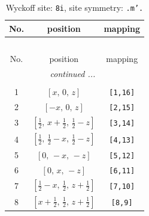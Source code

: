 \documentclass[fleqn,8pt]{jsarticle}
\begin{document}
\begin{longtable}{ccc}
\caption{Wyckoff site: {\tt 8i}, site symmetry: {\tt .m'.}}
 \\
 \hline \hline
No. & position & mapping \\ \hline \endfirsthead

\multicolumn{2}{l}{\tablename\ \thetable{}} \\
 \hline \hline
No. & position & mapping \\ \hline \endhead

 \hline \hline
\multicolumn{2}{r}{\footnotesize\it continued ...} \\ \endfoot

 \hline \hline
\multicolumn{2}{r}{} \\ \endlastfoot

1 & $\left[ x,\, 0,\, z \right]$ & {\tt [1,16]} \\ \hline
2 & $\left[ - x,\, 0,\, z \right]$ & {\tt [2,15]} \\ \hline
3 & $\left[ \frac{1}{2},\, x + \frac{1}{2},\, \frac{1}{2} - z \right]$ & {\tt [3,14]} \\ \hline
4 & $\left[ \frac{1}{2},\, \frac{1}{2} - x,\, \frac{1}{2} - z \right]$ & {\tt [4,13]} \\ \hline
5 & $\left[ 0,\, - x,\, - z \right]$ & {\tt [5,12]} \\ \hline
6 & $\left[ 0,\, x,\, - z \right]$ & {\tt [6,11]} \\ \hline
7 & $\left[ \frac{1}{2} - x,\, \frac{1}{2},\, z + \frac{1}{2} \right]$ & {\tt [7,10]} \\ \hline
8 & $\left[ x + \frac{1}{2},\, \frac{1}{2},\, z + \frac{1}{2} \right]$ & {\tt [8,9]} \\
\end{longtable}
\renewcommand{\arraystretch}{1.2}
\end{document}

